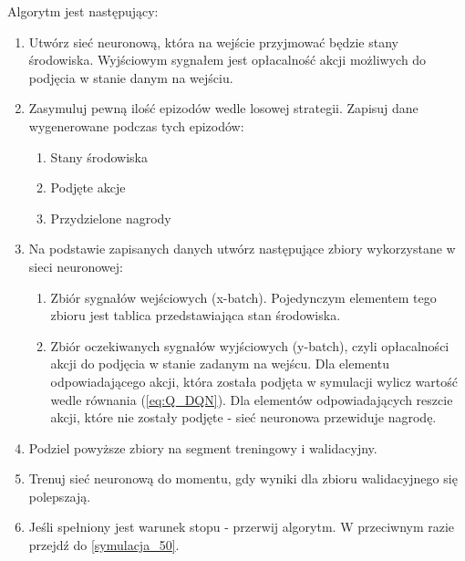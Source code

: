 \documentclass[12pt]{book}
\theoremstyle{plain}
\newcommand{\myref}[1]{(\ref{#1})}
\begin{document}
Algorytm jest następujący:
\begin{enumerate}
	\item Utwórz sieć neuronową, która na wejście przyjmować będzie stany środowiska. Wyjściowym sygnałem jest opłacalność akcji możliwych do podjęcia w stanie danym na wejściu.
	\item Zasymuluj pewną ilość epizodów wedle losowej strategii. Zapisuj dane wygenerowane podczas tych epizodów: \label{symulacja_50}
	\begin{enumerate}
		\item Stany środowiska
		\item Podjęte akcje
		\item Przydzielone nagrody
	\end{enumerate}
\item Na podstawie zapisanych danych utwórz następujące zbiory wykorzystane w sieci neuronowej:
	\begin{enumerate}
	\item Zbiór sygnałów wejściowych (x-batch). Pojedynczym elementem tego zbioru jest tablica przedstawiająca stan środowiska.
	\item Zbiór oczekiwanych sygnałów wyjściowych (y-batch), czyli opłacalności akcji do podjęcia w stanie zadanym na wejścu.
	Dla elementu odpowiadającego akcji, która została podjęta w symulacji wylicz wartość wedle równania \myref{eq:Q_DQN}. Dla elementów odpowiadających reszcie akcji, które nie zostały podjęte - sieć neuronowa przewiduje nagrodę. 
	\end{enumerate}
\item Podziel powyższe zbiory na segment treningowy i walidacyjny.
\item Trenuj sieć neuronową do momentu, gdy wyniki dla zbioru walidacyjnego się polepszają.
\item Jeśli spełniony jest warunek stopu - przerwij algorytm. W przeciwnym razie przejdź do \ref{symulacja_50}.
	
\end{enumerate}





\end{document}
